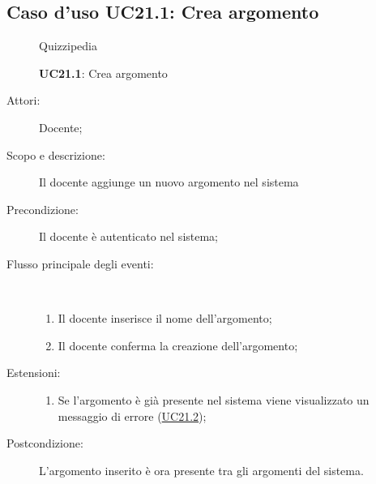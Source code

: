 \subsection{Caso d'uso UC21.1: Crea argomento}
	\begin{figure}[H]
		\centering
		\begin{resizedtikzpicture}{\textwidth}
		\begin{umlsystem}[x=0, fill=lightgray!20]{Quizzipedia}
		\end{umlsystem}
		\end{resizedtikzpicture}
		\caption{\textbf{UC21.1}: Crea argomento}
		\label{UC21.1}
	\end{figure}
\begin{description}
\item[Attori:] Docente;
\item[Scopo e descrizione:] Il docente aggiunge un nuovo argomento nel sistema
      \item[Precondizione:] Il docente è autenticato nel sistema;

        \item[Flusso principale degli eventi:] \ 
 \begin{enumerate}
          \item Il docente inserisce il nome dell'argomento;
          \item Il docente conferma la creazione dell'argomento;

      \end{enumerate}
    \item[Estensioni:]
      \begin{enumerate}
          \item Se l'argomento è già presente nel sistema viene visualizzato un messaggio di errore (\hyperlink{UC21.2}{UC21.2});

      \end{enumerate}
    \item[Postcondizione:] L'argomento inserito è ora presente tra gli argomenti del sistema.
  \end{description}
\hypertarget{UC21.2}{}
